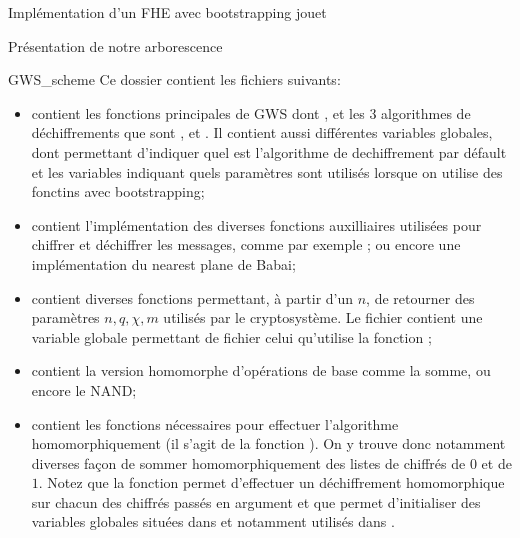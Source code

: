 \begin{section}{Implémentation d'un FHE avec bootstrapping \og{} jouet\fg~{}}
\begin{subsection}{Présentation de notre arborescence}
\begin{subsubsection}{GWS\_scheme}
Ce dossier contient les fichiers suivants:
\begin{itemize}
\item {} contient les fonctions principales de GWS
dont ,  et les 3 algorithmes de
déchiffrements que sont , 
et . Il contient aussi différentes variables
globales, dont  permettant d'indiquer quel est
l'algorithme de dechiffrement par défault et les variables 
 indiquant quels paramètres sont utilisés lorsque 
on utilise des fonctins avec bootstrapping;
\item {} contient l'implémentation 
	des diverses fonctions auxilliaires utilisées pour chiffrer 
	et déchiffrer les messages, comme par exemple ;
	ou encore une implémentation du nearest plane de Babai;
\item {} contient diverses fonctions permettant, à 
	partir d'un $n$, de retourner des paramètres $n, q, \chi, m$
	utilisés par le cryptosystème. Le fichier 
	contient une variable globale 
	permettant de fichier celui qu'utilise la fonction
	;
\item {} contient la version homomorphe
	d'opérations de base comme la somme, ou encore le NAND;
\item {} contient les fonctions nécessaires pour
	effectuer l'algorithme  homomorphiquement
	(il s'agit de la fonction ). On y trouve
	donc notamment diverses façon de sommer homomorphiquement
	des listes de chiffrés de $0$ et de $1$. Notez que la fonction
	 permet d'effectuer un déchiffrement 
	homomorphique sur chacun des chiffrés
	passés en argument et que  permet d'initialiser 
	des variables globales 
	situées dans  et notamment utilisés dans
	.
\end{itemize}
\end{subsubsection} %


\end{subsection}
\end{section}
